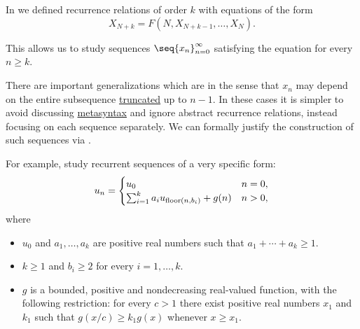 \begin{remark}\label{rem:unrestricted_recurrence_relation}
  In  we defined recurrence relations of  order \( k \) with equations of the form
  \begin{equation*}
    X_{N+k} = F(N, X_{N+k-1}, \ldots, X_N).
  \end{equation*}

  This allows us to study sequences \( \seq{ x_n }_{n=0}^\infty \) satisfying the equation for every \( n \geq k \).

  There are important generalizations which are  in the sense that \( x_n \) may depend on the entire subsequence \hyperref[def:truncated_sequence]{truncated} up to \( n - 1 \). In these cases it is simpler to avoid discussing \hyperref[con:metalanguage]{metasyntax} and ignore abstract recurrence relations, instead focusing on each sequence separately. We can formally justify the construction of such sequences via .

  For example,  study recurrent sequences of a very specific form:
  \begin{equation*}
    u_n = \begin{cases}
      u_0                                        &n = 0, \\
      \sum_{i=1}^k a_i u_{\operatorname{floor}(n, b_i)} + g(n) &n > 0,
    \end{cases}
  \end{equation*}
  where
  \begin{itemize}
    \item \( u_0 \) and \( a_1, \ldots, a_k \) are positive real numbers such that \( a_1 + \cdots + a_k \geq 1 \).
    \item \( k \geq 1 \) and \( b_i \geq 2 \) for every \( i = 1, \ldots, k \).
    \item \( g \) is a bounded, positive and nondecreasing real-valued function, with the following restriction: for every \( c > 1 \) there exist positive real numbers \( x_1 \) and \( k_1 \) such that \( g(x / c) \geq k_1 g(x) \) whenever \( x \geq x_1 \).
  \end{itemize}
\end{remark}

